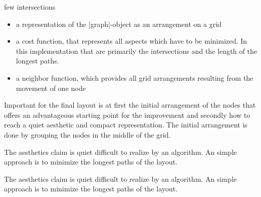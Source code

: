 \begin{gdalgorithm}{few intersections}
\begin{itemize}
\item a representation of the |graph|-object as an arrangement on a grid
\item a cost function, that represents all aspects which have to be minimized. In this implementation that are primarily the intersections and the length of the longest paths.
\item a neighbor function, which provides all grid arrangements resulting from the movement of one node
\end{itemize}
Important for the final layout is at first the initial arrangement of the nodes that offers an advantageous starting point for the improvement and secondly how to reach a quiet aesthetic and compact representation. The initial arrangement is done by grouping the nodes in the middle of the grid.
\par The aesthetics claim is quiet difficult to realize by an algorithm. An simple approach is to minimize the longest paths of the layout.

The aesthetics claim is quiet difficult to realize by an algorithm. An simple approach is to minimize the longest paths of the layout.
\end{gdalgorithm}

